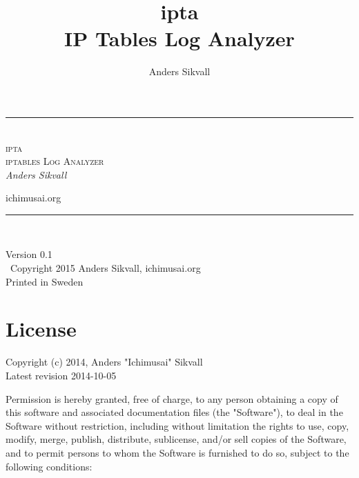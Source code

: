 \documentclass[english,twoside,openright,a4paper,12pt]{report}
\author{Anders Sikvall}
\title{
	\Huge ipta\\[2em]
	IP Tables Log Analyzer}
\newcommand{\titlerule}{\rule{\linewidth}{1pt}}
\begin{document}
\begin{titlepage}
	\thispagestyle{empty}
	\begin{center}
	\end{center}
	\begin{center}
		\titlerule\\[3mm]
		\Huge \textsc{ipta\\\Large iptables Log Analyzer}\\[5mm]
		\large \emph{Anders Sikvall}\\
		\begin{center}
			\normalsize ichimusai.org\\

		\end{center}
		\titlerule\\
	\end{center}
\end{titlepage}

\null\vfill\thispagestyle{empty}
\noindent

\begin{center}
	Version 0.1\\[5mm] \textcopyright\ Copyright 2015 Anders Sikvall, 
	ichimusai.org\\
	Printed in Sweden
	\newpage
\end{center}

\cleardoublepage
\tableofcontents

\setlength{\parindent}{0pt}
\setlength{\parskip}{1em}


\lhead{\nouppercase{\leftmark}}
\rhead{\nouppercase{\rightmark}}

\pagestyle{fancy}

\chapter*{License}
\label{license}

Copyright (c) 2014, Anders "Ichimusai" Sikvall\\
Latest revision 2014-10-05
 
Permission is hereby granted, free of charge, to any person obtaining a copy of this software and associated documentation files (the "Software"), to deal in the Software without restriction, including without limitation the rights to use, copy, modify, merge, publish, distribute, sublicense, and/or sell copies of the Software, and to permit persons to whom the Software is furnished to do so, subject to the following conditions:  
\end{document}
